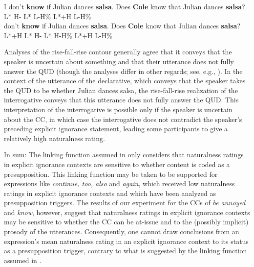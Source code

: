\documentclass[11pt,fleqn]{article}
\newcommand{\6}{\mbox{$[\hspace*{-.6mm}[$}}
\newcommand{\9}{\mbox{$]\hspace*{-.6mm}]$}}
\begin{document}
\begin{exe}
\ex\label{pros} 
\begin{xlist}
\ex \gll I don't {\bf know} if Julian dances {\bf salsa}. Does {\bf Cole} know that Julian dances {\bf salsa}? 
\\ {} {} {L* H-} {} {} {} {L* L-H\%} {} L*+H {} {} {} {} {\hspace*{.2cm} L-H\%} \\ \glt 
\ex {} don't {\bf know} if Julian dances {\bf salsa}. Does {\bf Cole} know that Julian dances {\bf salsa}? 
\\ L*+H {} {L* H-} {} {} {} {L* H-H\%} {} L*+H {} {} {} {} {\hspace*{.2cm} L-H\%} \\ \glt 
\end{xlist}
\end{exe}
Analyses of the rise-fall-rise contour generally agree that it conveys that the speaker is uncertain about something and that their utterance does not fully answer the QUD (though the analyses differ in other regards; see, e.g., \citealt{ward-hirschberg85,buering97,buering03,wagner-etal2013}). In the context of the utterance of the declarative, which conveys that the speaker takes the QUD to be whether Julian dances salsa, the rise-fall-rise realization of the interrogative conveys that this utterance does not fully answer the QUD. This interpretation of the interrogative is possible only if the speaker is uncertain about the CC, in which case the interrogative does not contradict the speaker's preceding explicit ignorance statement, leading some participants to give a relatively high naturalness rating.

\color{blue} 

In sum: The linking function assumed in \citealt{mandelkern-etal2020} only considers that naturalness ratings in explicit ignorance contexts are sensitive to whether content is coded as a presupposition. This linking function may be taken to be supported for expressions like {\em continue, too, also} and {\em again}, which received low naturalness ratings in explicit ignorance contexts and which have been analyzed as presupposition triggers. The results of our experiment for the CCs of {\em be annoyed} and {\em know}, however, suggest that naturalness ratings in explicit ignorance contexts may be sensitive to whether the CC can be at-issue and to the (possibly implicit) prosody of the utterances. Consequently, one cannot draw conclusions from an expression's mean naturalness rating in an explicit ignorance context to its status as a presupposition trigger, contrary to what is suggested by the linking function assumed in \citealt{mandelkern-etal2020}.
\end{document}

